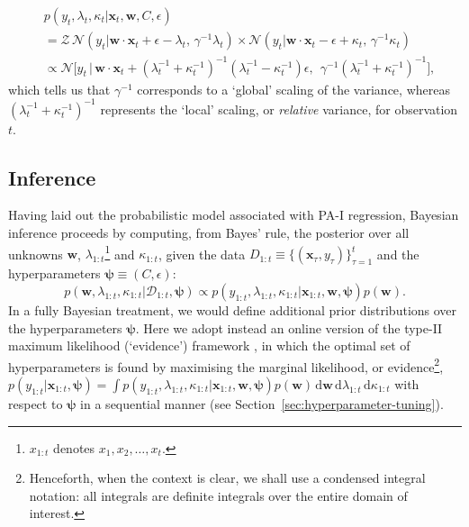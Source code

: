 \begin{equation}
\label{eq:augmented-ilf-likelihood-compact}
\begin{split}
	& p(y_t, \lambda_t, \kappa_t|\mathbf{x}_t, \mathbf{w}, C, \epsilon)
	\\
	&= \mathcal{Z}\,\mathcal{N}(y_t|\mathbf{w}\cdot\mathbf{x}_t + \epsilon - \lambda_t,\, \gamma^{-1}\lambda_t)
	\times \mathcal{N}(y_t|\mathbf{w}\cdot\mathbf{x}_t - \epsilon + \kappa_t,\, \gamma^{-1}\kappa_t)
	\\
	&\propto \mathcal{N}\big[y_t \, \big| \, \mathbf{w}\cdot\mathbf{x}_t + (\lambda_t^{-1} + \kappa_t^{-1})^{-1}(\lambda_t^{-1} - \kappa_t^{-1})\epsilon,\;\, \gamma^{-1}(\lambda_t^{-1} + \kappa_t^{-1})^{-1}\big],
\end{split}
\end{equation}
which tells us that $\gamma^{-1}$ corresponds to a `global' scaling of the variance, whereas $(\lambda_t^{-1} + \kappa_t^{-1})^{-1}$ represents the `local' scaling, or \emph{relative} variance, for observation $t$.

\subsection{Inference}
\label{sec:bayespa-inference}


Having laid out the probabilistic model associated with PA-I regression, Bayesian inference proceeds by computing, from Bayes' rule, the posterior over all unknowns $\mathbf{w}$, $\lambda_{1:t}$\footnote{$x_{1:t}$ denotes $x_1, x_2, \ldots, x_t$.} and $\kappa_{1:t}$, given the data $D_{1:t} \equiv \{(\mathbf{x}_\tau, y_\tau)\}_{\tau=1}^t$ and the hyperparameters $\boldsymbol{\psi} \equiv (C, \epsilon)$:
\begin{equation}
\label{eq:pa-full-posterior}
	p(\mathbf{w}, \lambda_{1:t}, \kappa_{1:t}|\mathcal{D}_{1:t}, \boldsymbol{\psi})
	\propto p(y_{1:t}, \lambda_{1:t}, \kappa_{1:t}|\mathbf{x}_{1:t}, \mathbf{w}, \boldsymbol{\psi})p(\mathbf{w}).
\end{equation}
In a fully Bayesian treatment, we would define additional prior distributions over the hyperparameters $\boldsymbol{\psi}$. Here we adopt instead an online version of the type-II maximum likelihood (`evidence') framework \citep{berger85, mackay92a}, in which the optimal set of hyperparameters is found by maximising the marginal likelihood, or evidence\footnote{Henceforth, when the context is clear, we shall use a condensed integral notation: all integrals are definite integrals over the entire domain of interest.}, $p(y_{1:t}|\mathbf{x}_{1:t}, \boldsymbol{\psi}) = \int p(y_{1:t}, \lambda_{1:t}, \kappa_{1:t}|\mathbf{x}_{1:t}, \mathbf{w}, \boldsymbol{\psi})p(\mathbf{w})\,\mathrm{d}\mathbf{w}\,\mathrm{d}\lambda_{1:t}\,\mathrm{d}\kappa_{1:t}$ with respect to $\boldsymbol{\psi}$ in a sequential manner (see Section~\ref{sec:hyperparameter-tuning}).


